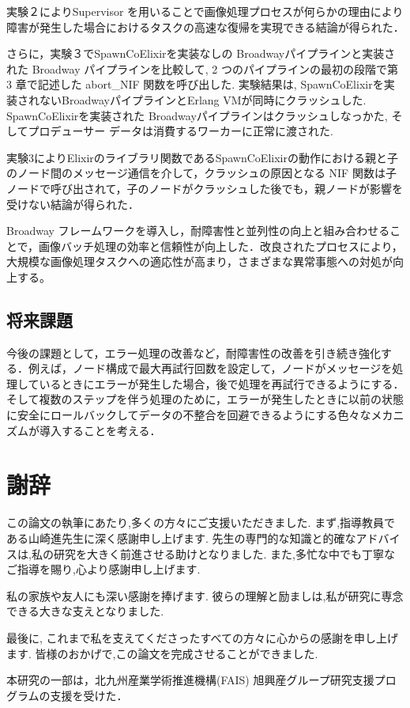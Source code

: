 \documentclass[a4paper]{jreport}	%
\begin{document}
実験２によりSupervisor を用いることで画像処理プロセスが何らかの理由により障害が発生した場合におけるタスクの高速な復帰を実現できる結論が得られた． 

さらに，実験３でSpawnCoElixirを実装なしの Broadwayパイプラインと実装された Broadway パイプラインを比較して, 2 つのパイプラインの最初の段階で第 3 章で記述した abort\_NIF 関数を呼び出した. 実験結果は, SpawnCoElixirを実装されないBroadwayパイプラインとErlang VMが同時にクラッシュした. SpawnCoElixirを実装された Broadwayパイプラインはクラッシュしなっかた, そしてプロデューサー データは消費するワーカーに正常に渡された.

実験3によりElixirのライブラリ関数であるSpawnCoElixirの動作における親と子のノード間のメッセージ通信を介して，クラッシュの原因となる NIF 関数は子ノードで呼び出されて，子のノードがクラッシュした後でも，親ノードが影響を受けない結論が得られた．

Broadway フレームワークを導入し，耐障害性と並列性の向上と組み合わせることで，画像バッチ処理の効率と信頼性が向上した．改良されたプロセスにより，大規模な画像処理タスクへの適応性が高まり，さまざまな異常事態への対処が向上する。

\section{将来課題}
今後の課題として，エラー処理の改善など，耐障害性の改善を引き続き強化する．例えば，ノード構成で最大再試行回数を設定して，ノードがメッセージを処理しているときにエラーが発生した場合，後で処理を再試行できるようにする．そして複数のステップを伴う処理のために，エラーが発生したときに以前の状態に安全にロールバックしてデータの不整合を回避できるようにする色々なメカニズムが導入することを考える．
\chapter*{謝辞}
この論文の執筆にあたり,多くの方々にご支援いただきました. まず,指導教員である山崎進先生に深く感謝申し上げます. 先生の専門的な知識と的確なアドバイスは,私の研究を大きく前進させる助けとなりました. また,多忙な中でも丁寧なご指導を賜り,心より感謝申し上げます. 

私の家族や友人にも深い感謝を捧げます. 彼らの理解と励ましは,私が研究に専念できる大きな支えとなりました. 

最後に, これまで私を支えてくださったすべての方々に心からの感謝を申し上げます. 皆様のおかげで,この論文を完成させることができました. 

本研究の一部は，北九州産業学術推進機構(FAIS) 旭興産グループ研究支援プログラムの支援を受けた．
\end{document}
